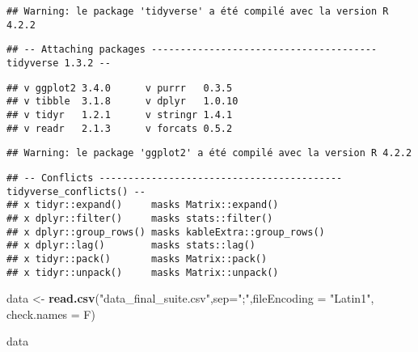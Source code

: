 \documentclass[
]{article}
\newenvironment{Shaded}{\begin{snugshade}}{\end{snugshade}}
\newcommand{\AttributeTok}[1]{\textcolor[rgb]{0.13,0.29,0.53}{#1}}
\newcommand{\FunctionTok}[1]{\textcolor[rgb]{0.13,0.29,0.53}{\textbf{#1}}}
\newcommand{\NormalTok}[1]{#1}
\newcommand{\OtherTok}[1]{\textcolor[rgb]{0.56,0.35,0.01}{#1}}
\newcommand{\StringTok}[1]{\textcolor[rgb]{0.31,0.60,0.02}{#1}}
\begin{document}
\begin{verbatim}
## Warning: le package 'tidyverse' a été compilé avec la version R 4.2.2
\end{verbatim}

\begin{verbatim}
## -- Attaching packages --------------------------------------- tidyverse 1.3.2 --
\end{verbatim}

\begin{verbatim}
## v ggplot2 3.4.0      v purrr   0.3.5 
## v tibble  3.1.8      v dplyr   1.0.10
## v tidyr   1.2.1      v stringr 1.4.1 
## v readr   2.1.3      v forcats 0.5.2
\end{verbatim}

\begin{verbatim}
## Warning: le package 'ggplot2' a été compilé avec la version R 4.2.2
\end{verbatim}

\begin{verbatim}
## -- Conflicts ------------------------------------------ tidyverse_conflicts() --
## x tidyr::expand()     masks Matrix::expand()
## x dplyr::filter()     masks stats::filter()
## x dplyr::group_rows() masks kableExtra::group_rows()
## x dplyr::lag()        masks stats::lag()
## x tidyr::pack()       masks Matrix::pack()
## x tidyr::unpack()     masks Matrix::unpack()
\end{verbatim}

\begin{Shaded}
\begin{Highlighting}[]
\NormalTok{data }\OtherTok{\textless{}{-}} \FunctionTok{read.csv}\NormalTok{(}\StringTok{"data\_final\_suite.csv"}\NormalTok{,}\AttributeTok{sep=}\StringTok{";"}\NormalTok{,}\AttributeTok{fileEncoding =} \StringTok{"Latin1"}\NormalTok{, }\AttributeTok{check.names =}\NormalTok{ F)}
\end{Highlighting}
\end{Shaded}

\begin{Shaded}
\begin{Highlighting}[]
\NormalTok{data}
\end{Highlighting}
\end{Shaded}
\end{document}
